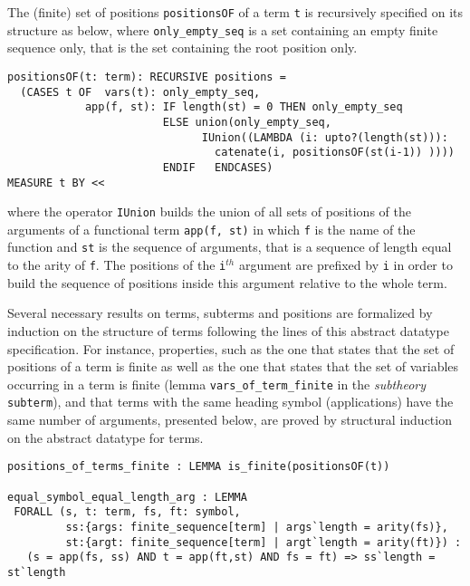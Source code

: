 \documentclass[submission,copyright,creativecommons]{eptcs}
\begin{document}
The (finite) set of positions {\tt positionsOF} of a term {\tt t} is recursively
specified on its structure as below, where {\tt only\_empty\_seq} is
a set containing an empty finite sequence only, that is the set
containing the root position only.

{\small
\begin{verbatim}
positionsOF(t: term): RECURSIVE positions =
  (CASES t OF  vars(t): only_empty_seq,
            app(f, st): IF length(st) = 0 THEN only_empty_seq 
                        ELSE union(only_empty_seq,
                              IUnion((LAMBDA (i: upto?(length(st))):
                                catenate(i, positionsOF(st(i-1)) ))))
                        ENDIF   ENDCASES)
MEASURE t BY << 
\end{verbatim}}

  \noindent where the operator {\tt IUnion} builds the union of all
  sets of positions of the arguments of a functional term {\tt app(f,
    st)} in which {\tt f} is the name of the function and {\tt st} is
  the sequence of arguments, that is a sequence of length equal to the
  arity of {\tt f}. The positions of the {\tt i}$^{th}$ argument are
  prefixed by {\tt i} in order to build the sequence of positions
  inside this argument relative to the whole term.
 
  Several necessary results on terms, subterms and positions are
  formalized by induction on the structure of terms following the
  lines of this abstract datatype specification. For instance,
  properties, such as the one that states that the set of positions of
  a term is finite as well as the
  one that states that the set of variables occurring in a term is
   finite (lemma {\tt vars\_of\_term\_finite} in the
   \emph{subtheory} {\tt subterm}), and that terms with the same heading symbol
  (applications) have the same number of arguments, presented below,
  are proved by structural induction on the abstract datatype for
  terms.

  {\small
\begin{verbatim}
positions_of_terms_finite : LEMMA is_finite(positionsOF(t))

equal_symbol_equal_length_arg : LEMMA
 FORALL (s, t: term, fs, ft: symbol, 
         ss:{args: finite_sequence[term] | args`length = arity(fs)},
         st:{argt: finite_sequence[term] | argt`length = arity(ft)}) :
   (s = app(fs, ss) AND t = app(ft,st) AND fs = ft) => ss`length = st`length
\end{verbatim}
  }
\end{document}
